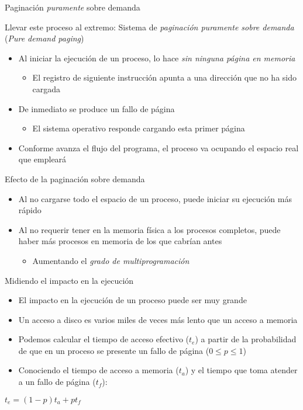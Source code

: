 \documentclass[presentation]{beamer}
\begin{document}
\begin{frame}[label={sec:org8c23e62}]{Paginación \emph{puramente} sobre demanda}
\begin{center}
Llevar este proceso al extremo: Sistema de \emph{paginación puramente sobre
demanda} (\emph{Pure demand paging})
\end{center}
\begin{itemize}
\item Al iniciar la ejecución de un proceso, lo hace \emph{sin ninguna página
en memoria}
\begin{itemize}
\item El registro de siguiente instrucción apunta a una dirección que no
ha sido cargada
\end{itemize}
\item De inmediato se produce un fallo de página
\begin{itemize}
\item El sistema operativo responde cargando esta primer página
\end{itemize}
\item Conforme avanza el flujo del programa, el proceso va ocupando el
espacio real que empleará
\end{itemize}
\end{frame}

\begin{frame}[label={sec:orgbdd0eae}]{Efecto de la paginación sobre demanda}
\begin{itemize}
\item Al no cargarse todo el espacio de un proceso, puede iniciar su
ejecución más rápido
\item Al no requerir tener en la memoria física a los procesos completos,
puede haber más procesos en memoria de los que cabrían antes
\begin{itemize}
\item Aumentando el \emph{grado de multiprogramación}
\end{itemize}
\end{itemize}
\end{frame}

\begin{frame}[label={sec:org71982d8}]{Midiendo el impacto en la ejecución}
\begin{itemize}
\item El impacto en la ejecución de un proceso puede ser muy grande
\item Un acceso a disco es varios miles de veces más lento que un acceso a
memoria
\item Podemos calcular el tiempo de acceso efectivo (\(t_e\)) a  partir de
la probabilidad de que en un proceso se presente un fallo de página
(\(0 \le p \le 1\))
\item Conociendo el tiempo de acceso a memoria (\(t_a\)) y el tiempo que
toma atender a un fallo de página (\(t_f\)):
\end{itemize}

\begin{center}
\(t_e = (1-p)t_a + pt_f\)
\end{center}
\end{frame}
\end{document}
